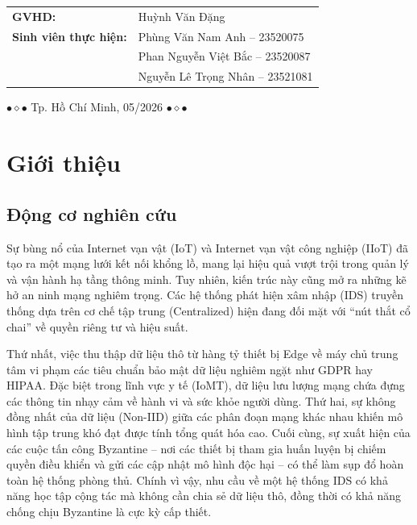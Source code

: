 \documentclass[12pt,a4paper]{article}
\begin{document}
\begin{titlepage}
\begin{center}
        \begin{center}
            \begin{tabular}{ll}
                \textbf{GVHD:} & Huỳnh Văn Đặng \\[0.25cm]
                \textbf{Sinh viên thực hiện:} & Phùng Văn Nam Anh -- 23520075 \\
                & Phan Nguyễn Việt Bắc -- 23520087 \\
                & Nguyễn Lê Trọng Nhân -- 23521081
            \end{tabular}
        \end{center}

        \vfill
        {\fontsize{13}{15}\selectfont $\bullet \diamond \bullet$ Tp. Hồ Chí Minh, 05/2026 $\bullet \diamond \bullet$}
    \end{center}
\end{titlepage}

\newpage
\tableofcontents
\newpage

\section{Giới thiệu}

\subsection{Động cơ nghiên cứu}
Sự bùng nổ của Internet vạn vật (IoT) và Internet vạn vật công nghiệp (IIoT) đã tạo ra một mạng lưới kết nối khổng lồ, mang lại hiệu quả vượt trội trong quản lý và vận hành hạ tầng thông minh. Tuy nhiên, kiến trúc này cũng mở ra những kẽ hở an ninh mạng nghiêm trọng. Các hệ thống phát hiện xâm nhập (IDS) truyền thống dựa trên cơ chế tập trung (Centralized) hiện đang đối mặt với ``nút thắt cổ chai'' về quyền riêng tư và hiệu suất.

Thứ nhất, việc thu thập dữ liệu thô từ hàng tỷ thiết bị Edge về máy chủ trung tâm vi phạm các tiêu chuẩn bảo mật dữ liệu nghiêm ngặt như GDPR hay HIPAA. Đặc biệt trong lĩnh vực y tế (IoMT), dữ liệu lưu lượng mạng chứa đựng các thông tin nhạy cảm về hành vi và sức khỏe người dùng. Thứ hai, sự không đồng nhất của dữ liệu (Non-IID) giữa các phân đoạn mạng khác nhau khiến mô hình tập trung khó đạt được tính tổng quát hóa cao. Cuối cùng, sự xuất hiện của các cuộc tấn công Byzantine -- nơi các thiết bị tham gia huấn luyện bị chiếm quyền điều khiển và gửi các cập nhật mô hình độc hại -- có thể làm sụp đổ hoàn toàn hệ thống phòng thủ. Chính vì vậy, nhu cầu về một hệ thống IDS có khả năng học tập cộng tác mà không cần chia sẻ dữ liệu thô, đồng thời có khả năng chống chịu Byzantine là cực kỳ cấp thiết.
\end{document}
